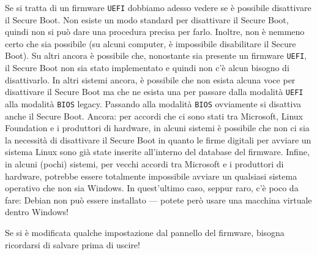 Se si tratta di un firmware \texttt{UEFI} dobbiamo adesso vedere se è possibile disattivare il Secure Boot. Non esiste un modo standard per disattivare il Secure Boot, quindi non si può dare una procedura precisa per farlo. Inoltre, non è nemmeno certo che sia possibile (su alcuni computer, è impossibile disabilitare il Secure Boot). Su altri ancora è possibile che, nonostante sia presente un firmware \texttt{UEFI}, il Secure Boot non sia stato implementato e quindi non c'è alcun bisogno di disattivarlo. In altri sistemi ancora, è possibile che non esista alcuna voce per disattivare il Secure Boot ma che ne esista una per passare dalla modalità \texttt{UEFI} alla modalità \texttt{BIOS} legacy. Passando alla modalità \texttt{BIOS} ovviamente si disattiva anche il Secure Boot. Ancora: per accordi che ci sono stati tra Microsoft, Linux Foundation e i produttori di hardware, in alcuni sistemi è possibile che non ci sia la necessità di disattivare il Secure Boot in quanto le firme digitali per avviare un sistema Linux sono già state inserite all'interno del database del firmware. Infine, in alcuni (pochi) sistemi, per vecchi accordi tra Microsoft e i produttori di hardware, potrebbe essere totalmente impossibile avviare un qualsiasi sistema operativo che non sia Windows. In quest'ultimo caso, seppur raro, c'è poco da fare: Debian non può essere installato --- potete però usare una macchina virtuale dentro Windows!

Se si è modificata qualche impostazione dal pannello del firmware, bisogna ricordarsi di salvare prima di uscire!
